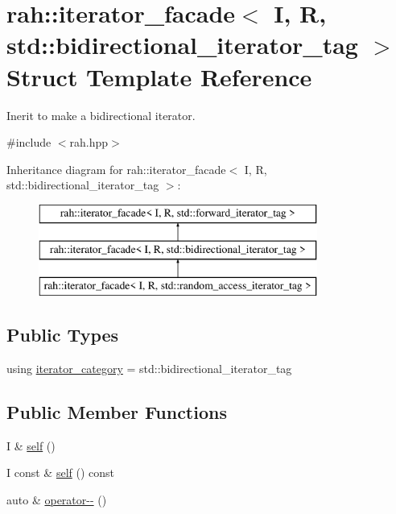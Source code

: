 \hypertarget{structrah_1_1iterator__facade_3_01_i_00_01_r_00_01std_1_1bidirectional__iterator__tag_01_4}{}\section{rah\+::iterator\+\_\+facade$<$ I, R, std\+::bidirectional\+\_\+iterator\+\_\+tag $>$ Struct Template Reference}
\label{structrah_1_1iterator__facade_3_01_i_00_01_r_00_01std_1_1bidirectional__iterator__tag_01_4}


Inerit to make a bidirectional iterator.  




{\ttfamily \#include $<$rah.\+hpp$>$}

Inheritance diagram for rah\+::iterator\+\_\+facade$<$ I, R, std\+::bidirectional\+\_\+iterator\+\_\+tag $>$\+:\begin{figure}[H]
\begin{center}
\leavevmode
\includegraphics[height=3.000000cm]{structrah_1_1iterator__facade_3_01_i_00_01_r_00_01std_1_1bidirectional__iterator__tag_01_4}
\end{center}
\end{figure}
\subsection*{Public Types}
\begin{DoxyCompactItemize}
\item 
using \mbox{\hyperlink{structrah_1_1iterator__facade_3_01_i_00_01_r_00_01std_1_1bidirectional__iterator__tag_01_4_a044a4ae4f097558e10b1d52b892a093a}{iterator\+\_\+category}} = std\+::bidirectional\+\_\+iterator\+\_\+tag
\end{DoxyCompactItemize}
\subsection*{Public Member Functions}
\begin{DoxyCompactItemize}
\item 
I \& \mbox{\hyperlink{structrah_1_1iterator__facade_3_01_i_00_01_r_00_01std_1_1bidirectional__iterator__tag_01_4_ae9bfe3425019c0ffb9156f298cba2980}{self}} ()
\item 
I const  \& \mbox{\hyperlink{structrah_1_1iterator__facade_3_01_i_00_01_r_00_01std_1_1bidirectional__iterator__tag_01_4_ae2156f4940ef87b6852ff7abe52002c9}{self}} () const
\item 
auto \& \mbox{\hyperlink{structrah_1_1iterator__facade_3_01_i_00_01_r_00_01std_1_1bidirectional__iterator__tag_01_4_aa75167b7030dfb55cbf7146b4e9f164f}{operator-\/-\/}} ()
\end{DoxyCompactItemize}


